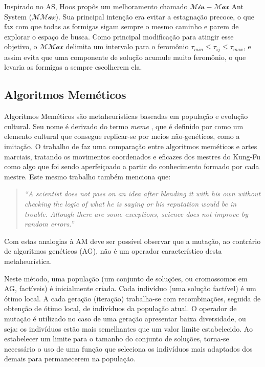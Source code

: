 Inspirado no AS, Hoos \cite{mmas-origin} propôs um melhoramento chamado
$\mathcal{Min-Max}$ Ant System ($\mathcal{MMax}$). Sua principal intenção
era evitar a estagnação precoce, o que faz com que todas as formigas sigam
sempre o mesmo caminho e parem de explorar o espaço de busca. Como principal
modificação para atingir esse objetivo, o $\mathcal{MMax}$ delimita um
intervalo para o feromônio $\tau_{min} \le \tau_{ij} \le \tau_{max}$,
e assim evita que uma componente de solução acumule muito feromônio,
o que levaria as formigas a sempre escolherem ela.

\subsection{Algoritmos Meméticos}

Algoritmos Meméticos \cite{moscato1} são metaheurísticas baseadas
em população e evolução cultural.
Seu nome é derivado do termo \textit{meme} \cite{dawkins}, que é
definido por \cite{oxford-dict} como um elemento cultural que consegue
replicar-se por meios não-genéticos, como a imitação.
O trabalho de \cite{moscato1} faz uma comparação entre algoritmos
meméticos e artes marciais, tratando os movimentos coordenados e
eficazes dos mestres do Kung-Fu como algo que foi sendo aperfeiçoado
a partir do conhecimento formado por cada mestre. Este mesmo trabalho
também menciona que:
\begin{quote}
\textit{``A scientist does not pass on an idea after blending it with
  his own without checking the logic of what he is saying or his
  reputation would be in trouble. Altough there are some
  exceptions, science does not improve by random errors.''}
\end{quote}
Com estas analogias à AM deve ser possível observar que a mutação, ao
contrário de algoritmos genéticos (AG), não é um operador
característico desta metaheurística.

Neste método, uma população (um conjunto de soluções, ou cromossomos
em AG, factíveis) é
inicialmente criada. Cada indivíduo (uma solução factível) é um ótimo
local. A cada geração (iteração) trabalha-se com recombinações,
seguida de obtenção de ótimo local, de indivíduos da população
atual. O operador de mutação é utilizado no caso de uma
geração apresentar baixa diversidade, ou seja: os indivíduos estão
mais semelhantes que um valor limite estabelecido.
Ao estabelecer um limite para o tamanho do conjunto de soluções,
torna-se necessário o uso de uma função que seleciona os indivíduos
mais adaptados dos demais para permanecerem na população.



